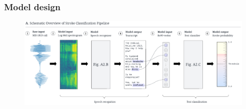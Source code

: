 




\begin{frame}
    \frametitle{Model design}
    \begin{figure}
        \centering
        \includegraphics[width=0.90\paperwidth]{../graphics/paper_retrospective/model_sketch-top-part.pdf}
    \end{figure}
\end{frame}


